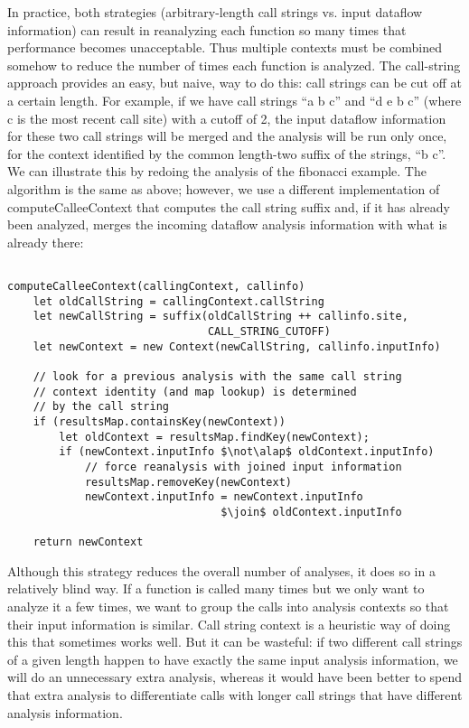 \documentclass[11pt]{article}
\newcommand{\join}{\sqcup}
\newcommand{\alap}{\sqsubseteq}
\begin{document}
In practice, both strategies (arbitrary-length call strings vs. input dataflow information) can result in reanalyzing each function so many times that performance becomes unacceptable.  Thus multiple contexts must be combined somehow to reduce the number of times each function is analyzed.  The call-string approach provides an easy, but naive, way to do this: call strings can be cut off at a certain length.  For example, if we have call strings ``a b c'' and ``d e b c'' (where c is the most recent call site) with a cutoff of 2, the input dataflow information for these two call strings will be merged and the analysis will be run only once, for the context identified by the common length-two suffix of the strings, ``b c''.  We can illustrate this by redoing the analysis of the fibonacci example.  The algorithm is the same as above; however, we use a different implementation of computeCalleeContext that computes the call string suffix and, if it has already been analyzed, merges the incoming dataflow analysis information with what is already there:

\begin{lstlisting}[mathescape]

computeCalleeContext(callingContext, callinfo)
    let oldCallString = callingContext.callString
    let newCallString = suffix(oldCallString ++ callinfo.site,
                               CALL_STRING_CUTOFF)
    let newContext = new Context(newCallString, callinfo.inputInfo)

    // look for a previous analysis with the same call string
    // context identity (and map lookup) is determined
    // by the call string
    if (resultsMap.containsKey(newContext))
        let oldContext = resultsMap.findKey(newContext);
        if (newContext.inputInfo $\not\alap$ oldContext.inputInfo)
        	// force reanalysis with joined input information
            resultsMap.removeKey(newContext)
            newContext.inputInfo = newContext.inputInfo
                                 $\join$ oldContext.inputInfo
			
    return newContext

\end{lstlisting}

Although this strategy reduces the overall number of analyses, it does so in a relatively blind way.  If a function is called many times but we only want to analyze it a few times, we want to group the calls into analysis contexts so that their input information is similar.  Call string context is a heuristic way of doing this that sometimes works well.  But it can be wasteful: if two different call strings of a given length happen to have exactly the same input analysis information, we will do an unnecessary extra analysis, whereas it would have been better to spend that extra analysis to differentiate calls with longer call strings that have different analysis information.
\end{document}
